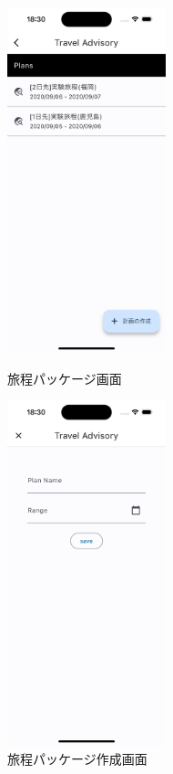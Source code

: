 \begin{figure}[H]
  \begin{minipage}[b]{0.45\linewidth}
    \centering
    \includegraphics[height=10cm]{./fig/travel_pack_list.png}
    \caption{旅程パッケージ画面}
    \label{fig:travel_pack_list}
  \end{minipage}
  \begin{minipage}[b]{0.45\linewidth}
    \centering
    \includegraphics[height=10cm]{./fig/travel_pack_create.png}
    \caption{旅程パッケージ作成画面}
    \label{fig:travel_pack_create}
  \end{minipage}
\end{figure}

